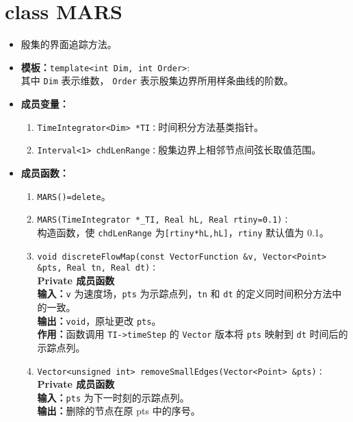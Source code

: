 \documentclass[a4paper,twoside]{ctexart}
\begin{document}
\section{class MARS}
\begin{itemize}
    \item 殷集的界面追踪方法。
    \item \textbf{模板：}\texttt{template<int Dim, int Order>}:\\
    其中 \texttt{Dim} 表示维数， \texttt{Order} 表示殷集边界所用样条曲线的阶数。
    \item \textbf{成员变量：}
            \begin{enumerate}[(1)]
                \item \texttt{TimeIntegrator<Dim> *TI：}时间积分方法基类指针。
                \item \texttt{Interval<1> chdLenRange：}殷集边界上相邻节点间弦长取值范围。
            \end{enumerate}
    \item \textbf{成员函数：}
            \begin{enumerate}[(1)]
                \item \texttt{MARS()=delete}。
                \item \texttt{MARS(TimeIntegrator *\_TI, Real hL, Real rtiny=0.1)：}\\
                构造函数，使 \texttt{chdLenRange} 为\texttt{[rtiny*hL,hL]}，\texttt{rtiny} 默认值为 0.1。
                \item \texttt{void discreteFlowMap(const VectorFunction \&v, Vector<Point> \&pts, Real tn, Real dt)：}\\
                \textbf{Private 成员函数}\\
                \textbf{输入：}\texttt{v} 为速度场，\texttt{pts} 为示踪点列，\texttt{tn} 和 \texttt{dt} 的定义同时间积分方法中的一致。\\
                \textbf{输出：}\texttt{void}，原址更改 \texttt{pts}。\\
                \textbf{作用：}函数调用 \texttt{TI->timeStep} 的 \texttt{Vector} 版本将 \texttt{pts} 映射到 \texttt{dt} 时间后的示踪点列。
                \item \texttt{Vector<unsigned int> removeSmallEdges(Vector<Point> \&pts)：}\\
                \textbf{Private 成员函数}\\
                \textbf{输入：}\texttt{pts} 为下一时刻的示踪点列。\\
                \textbf{输出：}删除的节点在原 pts 中的序号。\\

\end{enumerate}
\end{itemize}
\end{document}
